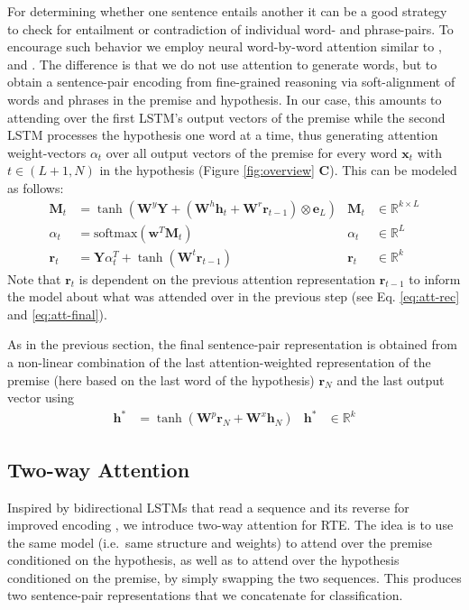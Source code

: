 \documentclass{article}
\begin{document}
For determining whether one sentence entails another it can be a good strategy to check for entailment or contradiction of individual word- and phrase-pairs.
To encourage such behavior we employ neural word-by-word attention similar to \cite{bahdanau2015neural}, \cite{hermann2015teaching} and \cite{rush2015neural}.
The difference is that we do not use attention to generate words, but to obtain a sentence-pair encoding from fine-grained reasoning via soft-alignment of words and phrases in the premise and hypothesis.
In our case, this amounts to attending over the first LSTM's output vectors of the premise while the second LSTM processes the hypothesis one word at a time, thus generating attention weight-vectors $\alpha_t$ over all output vectors of the premise for every word $\mathbf{x}_t$ with $t\in(L+1, N)$ in the hypothesis (Figure \ref{fig:overview} \textbf{C}).
This can be modeled as follows:
\begin{align}
  \mathbf{M}_t &= \tanh(\mathbf{W}^y\mathbf{Y}+(\mathbf{W}^h\mathbf{h}_t+\mathbf{W}^r\mathbf{r}_{t-1})\otimes \mathbf{e}_L) & \mathbf{M}_t &\in\mathbb{R}^{k\times L}\label{eq:att-rec}\\
  \alpha_t &= \text{softmax}(\mathbf{w}^T\mathbf{M}_t)&\alpha_t&\in\mathbb{R}^L\\
  \mathbf{r}_t &= \mathbf{Y}\alpha^T_t + \tanh(\mathbf{W}^t\mathbf{r}_{t-1})&\mathbf{r}_t&\in\mathbb{R}^k\label{eq:att-final}
\end{align}
Note that $\mathbf{r}_t$ is dependent on the previous attention representation $\mathbf{r}_{t-1}$ to inform the model about what was attended over in the previous step (see Eq. \ref{eq:att-rec} and \ref{eq:att-final}).

As in the previous section, the final sentence-pair representation is obtained from a non-linear combination of the last attention-weighted representation of the premise (here based on the last word of the hypothesis) $\mathbf{r}_N$ and the last output vector using
\begin{align}
  \mathbf{h}^* & = \tanh(\mathbf{W}^p\mathbf{r}_N+\mathbf{W}^x\mathbf{h}_N)&\mathbf{h}^*&\in\mathbb{R}^k\label{eq:iatt}
\end{align}

\subsection{Two-way Attention}
\label{sec:two}
Inspired by bidirectional LSTMs that read a sequence and its reverse for improved encoding \citep{graves2005framewise}, we introduce two-way attention for RTE.
The idea is to use the same model (i.e.~same structure and weights) to attend over the premise conditioned on the hypothesis, as well as to attend over the hypothesis conditioned on the premise, by simply swapping the two sequences.
This produces two sentence-pair representations that we concatenate for classification.
\end{document}
